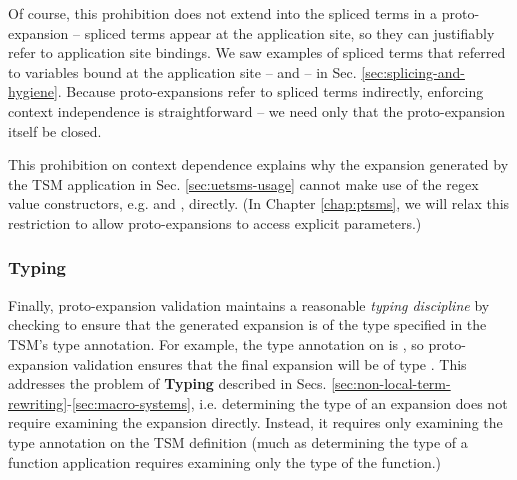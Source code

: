 Of course, this prohibition does not extend into the spliced terms in a proto-expansion -- spliced terms appear at the application site, so they can justifiably refer to application site bindings. We saw examples of spliced terms that referred to variables bound at the application site  --  and  -- in Sec. \ref{sec:splicing-and-hygiene}. Because proto-expansions refer to spliced terms indirectly, enforcing context independence is straightforward -- we need only that the proto-expansion itself be closed.%

This prohibition on context dependence explains why the expansion generated by the TSM application in Sec. \ref{sec:uetsms-usage} cannot make use of the regex value constructors, e.g.  and , directly. (In Chapter \ref{chap:ptsms}, we will relax this restriction to allow proto-expansions to access explicit parameters.)


\subsubsection{Typing}
Finally, proto-expansion validation maintains a reasonable \emph{typing discipline} by checking to ensure that the generated expansion is of the type specified in the TSM's type annotation. For example, the type annotation on  is , so proto-expansion validation ensures that the final expansion will be of type . This addresses the problem of \textbf{Typing} described in Secs. \ref{sec:non-local-term-rewriting}-\ref{sec:macro-systems}, i.e. determining the type of an expansion does not require examining the expansion directly. Instead, it requires only examining the type annotation on the TSM definition (much as determining the type of a function application requires examining only the type of the function.)


